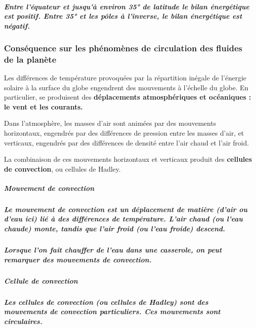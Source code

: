 \subparagraph{Entre l'équateur et jusqu'à environ 35° de latitude le
bilan énergétique est positif. Entre 35° et les pôles à l'inverse, le
bilan énergétique est
négatif.}\label{entre-luxe9quateur-et-jusquuxe0-environ-35-de-latitude-le-bilan-uxe9nerguxe9tique-est-positif.-entre-35-et-les-puxf4les-uxe0-linverse-le-bilan-uxe9nerguxe9tique-est-nuxe9gatif.}

\subsubsection{Conséquence sur les phénomènes de circulation des fluides
de la
planète}\label{consuxe9quence-sur-les-phuxe9nomuxe8nes-de-circulation-des-fluides-de-la-planuxe8te}

Les différences de température provoquées par la répartition inégale de
l'énergie solaire à la surface du globe engendrent des mouvements à
l'échelle du globe. En particulier, se produisent des
\textbf{déplacements atmosphériques et océaniques : le vent et les
courants.}

Dans l'atmosphère, les masses d'air sont animées par des mouvements
horizontaux, engendrés par des différences de pression entre les masses
d'air, et verticaux, engendrés par des différences de densité entre
l'air chaud et l'air froid.

La combinaison de ces mouvements horizontaux et verticaux produit des
\textbf{cellules de convection}, ou cellules de Hadley.

\subparagraph{\texorpdfstring{\textbf{Mouvement de
convection}}{Mouvement de convection}}\label{mouvement-de-convection}

\subparagraph{Le mouvement de convection est un déplacement de matière
(d'air ou d'eau ici) lié à des différences de température. L'air chaud
(ou l'eau chaude) monte, tandis que l'air froid (ou l'eau froide)
descend.}\label{le-mouvement-de-convection-est-un-duxe9placement-de-matiuxe8re-dair-ou-deau-ici-liuxe9-uxe0-des-diffuxe9rences-de-tempuxe9rature.-lair-chaud-ou-leau-chaude-monte-tandis-que-lair-froid-ou-leau-froide-descend.}

\subparagraph{Lorsque l'on fait chauffer de l'eau dans une casserole, on
peut remarquer des mouvements de
convection.}\label{lorsque-lon-fait-chauffer-de-leau-dans-une-casserole-on-peut-remarquer-des-mouvements-de-convection.}

\subparagraph{\texorpdfstring{\textbf{Cellule de
convection}}{Cellule de convection}}\label{cellule-de-convection}

\subparagraph{Les cellules de convection (ou cellules de Hadley) sont
des mouvements de convection particuliers. Ces mouvements sont
circulaires.}\label{les-cellules-de-convection-ou-cellules-de-hadley-sont-des-mouvements-de-convection-particuliers.-ces-mouvements-sont-circulaires.}

